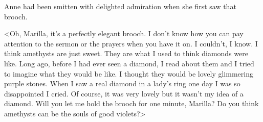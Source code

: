Anne had been smitten with delighted admiration when she first saw that brooch.

<Oh, Marilla, it's a perfectly elegant brooch. I don't know how you can pay attention to the sermon or the prayers when you have it on. I couldn't, I know. I think amethysts are just sweet. They are what I used to think diamonds were like. Long ago, before I had ever seen a diamond, I read about them and I tried to imagine what they would be like. I thought they would be lovely glimmering purple stones. When I saw a real diamond in a lady's ring one day I was so disappointed I cried. Of course, it was very lovely but it wasn't my idea of a diamond. Will you let me hold the brooch for one minute, Marilla? Do you think amethysts can be the souls of good violets?>